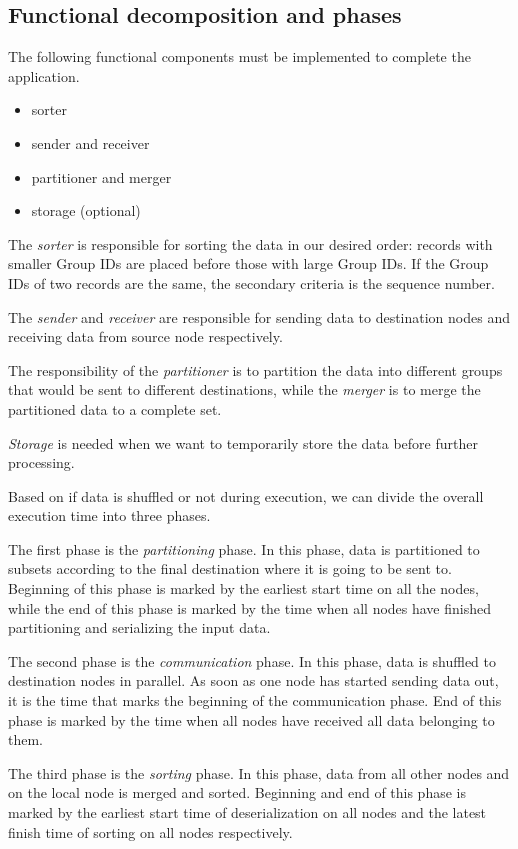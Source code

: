 \documentclass{article}
\begin{document}
\subsection{Functional decomposition and phases}

The following functional components must be implemented to complete the application.
\begin{itemize}
    \item sorter
    \item sender and receiver
    \item partitioner and merger
    \item storage (optional)
\end{itemize}

The \textit{sorter} is responsible for sorting the data in our desired order: records with smaller Group IDs are placed before those with large Group IDs.
If the Group IDs of two records are the same, the secondary criteria is the sequence number.

The \textit{sender} and \textit{receiver} are responsible for sending data to destination nodes and receiving data from source node respectively.

The responsibility of the \textit{partitioner} is to partition the data into different groups that would be sent to different destinations,
while the \textit{merger} is to merge the partitioned data to a complete set.

\textit{Storage} is needed when we want to temporarily store the data before further processing.

Based on if data is shuffled or not during execution, we can divide the overall execution time into three phases.

The first phase is the \textit{partitioning} phase.
In this phase, data is partitioned to subsets according to the final destination where it is going to be sent to.
Beginning of this phase is marked by the earliest start time on all the nodes,
while the end of this phase is marked by the time when all nodes have finished partitioning and serializing the input data.

The second phase is the \textit{communication} phase.
In this phase, data is shuffled to destination nodes in parallel.
As soon as one node has started sending data out, it is the time that marks the beginning of the communication phase.
End of this phase is marked by the time when all nodes have received all data belonging to them.

The third phase is the \textit{sorting} phase.
In this phase, data from all other nodes and on the local node is merged and sorted.
Beginning and end of this phase is marked by the earliest start time of deserialization on all nodes and the latest finish time of sorting on all nodes respectively.
\end{document}
